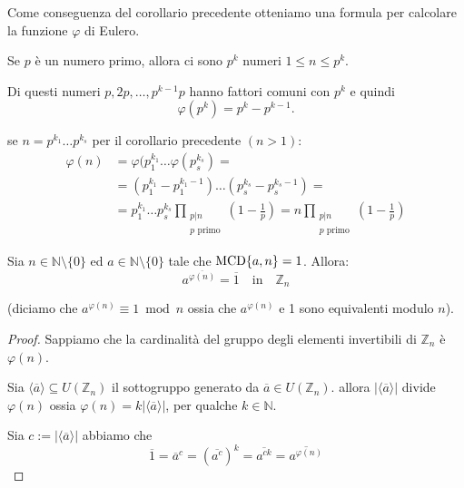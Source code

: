 \documentclass[../main.tex]{subfiles}
\begin{document}
Come conseguenza del corollario precedente otteniamo una formula per calcolare la funzione $\varphi$ di Eulero.

Se $p$ è un numero primo, allora ci sono $p^k$ numeri $1 \leq n \leq p^k$.

Di questi numeri $p, 2p, \ldots , p^{k-1}p$ hanno fattori comuni con $p^k$ e quindi
\begin{equation*}
    \varphi(p^k) = p^k - p^{k-1}.
\end{equation*}

se $n = p^{k_1}\ldots p^{k_s}$ per il corollario precedente $(n>1)$:
\begin{align*}
    \varphi(n) & = \varphi(p_1^{k_1}\ldots\varphi(p_s^{k_s}) =            \\
               & = (p_1^{k_1}-p_1^{k_1-1})\ldots(p_s^{k_s}-p_s^{k_s-1}) = \\
               & = p_1^{k_1} \ldots p_s^{k_s}\prod_{\substack{p|n         \\ p \text{ primo}}}\left(1-\frac{1}{p}\right) = n \prod_{\substack{p|n \\ p \text{ primo}}}\left(1-\frac{1}{p}\right)
\end{align*}

\begin{theorem}[di Eulero]
    Sia $n \in \mathbb{N} \setminus \{0\}$ ed $a \in \mathbb{N} \setminus \{0\}$ tale che $\operatorname{MCD}\{a,n\} = 1$. Allora:
    \begin{equation*}
        a^{\overline{\varphi(n)}} = \overline{1} \quad \text{in} \quad \mathbb{Z}_n
    \end{equation*}

    (diciamo che $a^{\varphi(n)} \equiv 1 \bmod n$ ossia che $a^{\varphi(n)}$ e 1 sono equivalenti modulo $n$).
\end{theorem}

\begin{proof}
    Sappiamo che la cardinalità del gruppo degli elementi invertibili di $\mathbb{Z}_n$ è $\varphi(n)$.

    Sia $\langle\overline{a}\rangle \subseteq U(\mathbb{Z}_n)$ il sottogruppo generato da $\overline{a} \in U(\mathbb{Z}_n)$. allora $|\langle\overline{a}\rangle|$ divide $\varphi(n)$ ossia $\varphi(n) = k |\langle\overline{a}\rangle|$, per qualche $k \in \mathbb{N}$.

    Sia $c := |\langle\overline{a}\rangle|$ abbiamo che
    \begin{equation*}
        \overline{1} = \overline{a}^c = (\overline{a^c})^k = \overline{a^{ck}} = \overline{a^{\varphi(n)}}
    \end{equation*}
\end{proof}
\end{document}
